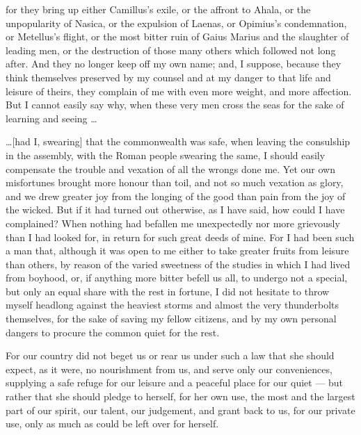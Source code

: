  for they bring up either Camillus's exile, or the affront to Ahala, or the unpopularity of Nasica, or the expulsion of Laenas, or Opimius's condemnation, or Metellus's flight, or the most bitter ruin of Gaius Marius and the slaughter of leading men, or the destruction of those many others which followed not long after. And they no longer keep off my own name; and, I suppose, because they think themselves preserved by my counsel and at my danger to that life and leisure of theirs, they complain of me with even more weight, and more affection. But I cannot easily say why, when these very men cross the seas for the sake of learning and seeing \ldots

 \ldots [had I, swearing] that the commonwealth was safe, when leaving the consulship in the assembly, with the Roman people swearing the same, I should easily compensate the trouble and vexation of all the wrongs done me. Yet our own misfortunes brought more honour than toil, and not so much vexation as glory, and we drew greater joy from the longing of the good than pain from the joy of the wicked. But if it had turned out otherwise, as I have said, how could I have complained? When nothing had befallen me unexpectedly nor more grievously than I had looked for, in return for such great deeds of mine. For I had been such a man that, although it was open to me either to take greater fruits from leisure than others, by reason of the varied sweetness of the studies in which I had lived from boyhood, or, if anything more bitter befell us all, to undergo not a special, but only an equal share with the rest in fortune, I did not hesitate to throw myself headlong against the heaviest storms and almost the very thunderbolts themselves, for the sake of saving my fellow citizens, and by my own personal dangers to procure the common quiet for the rest.

 For our country did not beget us or rear us under such a law that she should expect, as it were, no nourishment from us, and serve only our conveniences, supplying a safe refuge for our leisure and a peaceful place for our quiet --- but rather that she should pledge to herself, for her own use, the most and the largest part of our spirit, our talent, our judgement, and grant back to us, for our private use, only as much as could be left over for herself.

